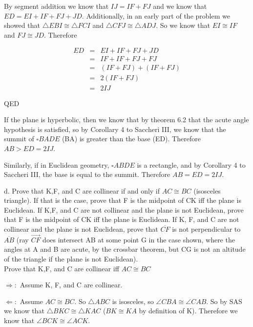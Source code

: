 \documentclass[12pt,letterpaper]{article}
\newcommand{\Proof}{\noindent {\bf Proof: }}
\newcommand{\QED}{\begin{flushright}QED\end{flushright}}
\begin{document}
\Proof


By segment addition we know that $IJ = IF + FJ$ and we know that $ED = EI + IF + FJ + JD$.  Additionally, in an early part of the problem we showed that $\triangle EBI \cong \triangle FCI$ and $\triangle CFJ \cong \triangle ADJ$.  So we know that $EI \cong IF$ and $FJ \cong JD$.  Therefore 

\begin{eqnarray*}
ED &=& EI + IF + FJ + JD\\
&=& IF + IF + FJ + FJ\\
&=& (IF + FJ) + (IF + FJ)\\
&=& 2(IF + FJ)\\
&=& 2IJ
\end{eqnarray*}

\QED


If the plane is hyperbolic, then we know that by theorem 6.2 that the acute angle hypothesis is satisfied, so by Corollary 4 to Saccheri III, we know that the summit of $\square BADE$ (BA) is greater than the base (ED).  Therefore $AB > ED = 2IJ$.  

Similarly, if in Euclidean geometry, $\square ABDE$ is a rectangle, and by Corollary 4 to Saccheri III, the base is equal to the summit.  Therefore $AB = ED = 2IJ$.  






\newpage 

d. Prove that K,F, and C are collinear if and only if $AC \cong BC$ (isosceles triangle).  If that is the case, prove that F is the midpoint of CK iff the plane is Euclidean.  If K,F, and C are not collinear and the plane is not Euclidean, prove that F is the midpoint of CK iff the plane is Euclidean.  If K, F, and C are not collinear and the plane is not Euclidean, prove that $\overline{CF}$ is not perpendicular to $\overline{AB}$ (ray $\overrightarrow{CF}$ does intersect AB at some point G in the case shown, where the angles at A and B are acute, by the crossbar theorem, but CG is not an altitude of the triangle if the plane is not Euclidean).\\

Prove that K,F, and C are collinear iff $AC \cong BC$\\

\Proof

$\Rightarrow:$  Assume K, F, and C are collinear.




$\Leftarrow:$  Assume $AC \cong BC$.  So $\triangle ABC$ is isosceles, so $\angle CBA \cong \angle CAB$.  So by SAS we know that $\triangle BKC \cong \triangle KAC$ ($BK \cong KA$ by definition of K).  Therefore we know that $\angle BCK \cong \angle ACK$. 
\end{document}
